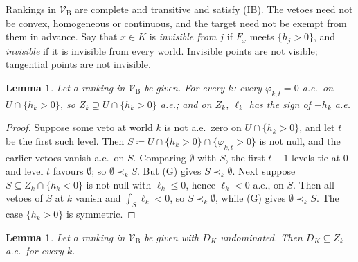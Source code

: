 \documentclass[11pt]{article}
\newcommand{\VBB}{\mathcal{V}_{\mathrm B}}
\theoremstyle{plain}
\newtheorem{lemma}[theorem]{Lemma}
\theoremstyle{definition}
\theoremstyle{remark}
\begin{document}
Rankings in $\VBB$ are complete and transitive and satisfy (IB). The vetoes need not be
convex, homogeneous or continuous, and the target need not be exempt from them in
advance. Say that $x\in K$ is \emph{invisible from $j$} if $F_x$ meets $\{h_j>0\}$, and
\emph{invisible} if it is invisible from every world. Invisible points are not visible;
tangential points are not invisible.

\begin{lemma}\label{lem:V1a}
Let a ranking in $\VBB$ be given. For every $k$: every $\varphi_{k,t}=0$ a.e.\ on $U\cap
\{h_k>0\}$, so $Z_k\supseteq U\cap\{h_k>0\}$ a.e.; and on $Z_k$, $\ell_k$ has the sign of
$-h_k$ a.e.
\end{lemma}

\begin{proof}
Suppose some veto at world $k$ is not a.e.\ zero on $U\cap\{h_k>0\}$, and let $t$ be the
first such level. Then $S\coloneqq U\cap\{h_k>0\}\cap\{\varphi_{k,t}>0\}$ is not null, and
the earlier vetoes vanish a.e.\ on $S$. Comparing $\emptyset$ with $S$, the first $t-1$
levels tie at $0$ and level $t$ favours $\emptyset$; so $\emptyset\prec_kS$. But (G) gives
$S\prec_k\emptyset$. Next suppose $S\subseteq Z_k\cap\{h_k<0\}$ is not null with
$\ell_k\le0$, hence $\ell_k<0$ a.e., on $S$. Then all vetoes of $S$ at $k$ vanish and
$\int_S\ell_k<0$, so $S\prec_k\emptyset$, while (G) gives $\emptyset\prec_kS$. The case
$\{h_k>0\}$ is symmetric.
\end{proof}

\begin{lemma}\label{lem:V2}
Let a ranking in $\VBB$ be given with $D_K$ undominated. Then $D_K\subseteq Z_k$ a.e.\ for
every $k$.
\end{lemma}
\end{document}
